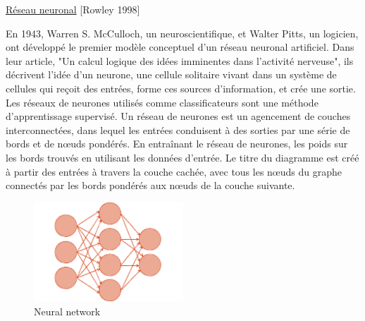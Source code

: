 \documentclass[12pt]{article}
\begin{document}
{%

\underline{Réseau neuronal}  {\color{red}[Rowley 1998]}

En 1943, Warren S. McCulloch, un neuroscientifique, et Walter Pitts, un logicien, ont développé le premier modèle conceptuel d'un réseau neuronal artificiel. Dans leur article, "Un calcul logique des idées imminentes dans l'activité nerveuse", ils décrivent l'idée d'un neurone, une cellule solitaire vivant dans un système de cellules qui reçoit des entrées, forme ces sources d'information, et crée une sortie.
Les réseaux de neurones utilisés comme classificateurs sont une méthode d'apprentissage supervisé.
Un réseau de neurones est un agencement de couches interconnectées, dans lequel les entrées conduisent à des sorties par une série de bords et de nœuds pondérés.
En entraînant le réseau de neurones, les poids sur les bords trouvés en utilisant les données d'entrée. Le titre du diagramme est créé à partir des entrées à travers la couche cachée, avec tous les nœuds du graphe connectés par les bords pondérés aux nœuds de la couche suivante.

\begin{figure}[H]
	\centering
    \includegraphics[width=0.5\textwidth]{image16.png}
     \caption{ Neural network }
    \label{fig:16}
\end{figure}


}
\end{document}
